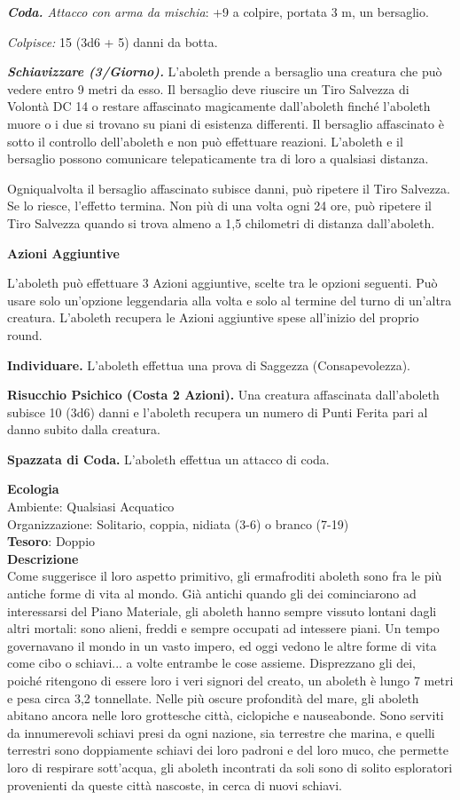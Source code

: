 \begin{multicols}{2}
\textit{\textbf{Coda.} Attacco con arma da mischia}: +9 a colpire, portata 3 m, un bersaglio.

\textit{Colpisce:} 15 (3d6 + 5) danni da botta.

\textit{\textbf{Schiavizzare (3/Giorno).}} L'aboleth prende a bersaglio una creatura che può vedere entro 9 metri da esso. Il bersaglio deve riuscire un Tiro Salvezza di Volontà DC 14 o restare affascinato magicamente dall'aboleth finché l'aboleth muore o i due si trovano su piani di esistenza differenti. Il bersaglio affascinato è sotto il controllo dell'aboleth e non può effettuare reazioni. L'aboleth e il bersaglio possono comunicare telepaticamente tra di loro a qualsiasi distanza.

Ogniqualvolta il bersaglio affascinato subisce danni, può ripetere il Tiro Salvezza. Se lo riesce, l'effetto termina. Non più di una volta ogni 24 ore, può ripetere il Tiro Salvezza quando si trova almeno a 1,5 chilometri di distanza dall'aboleth.

\textbf{Azioni Aggiuntive}

L'aboleth può effettuare 3 Azioni aggiuntive, scelte tra le opzioni seguenti. Può usare solo un'opzione leggendaria alla volta e solo al termine del turno di un'altra creatura. L'aboleth recupera le Azioni aggiuntive spese all'inizio del proprio round.

\textbf{Individuare.} L'aboleth effettua una prova di Saggezza (Consapevolezza).

\textbf{Risucchio Psichico (Costa 2 Azioni).} Una creatura affascinata dall'aboleth subisce 10 (3d6) danni e l'aboleth recupera un numero di Punti Ferita pari al danno subito dalla creatura.

\textbf{Spazzata di Coda.} L'aboleth effettua un attacco di coda.

\textbf{Ecologia}\\
Ambiente: Qualsiasi Acquatico\\
Organizzazione: Solitario, coppia, nidiata (3-6) o branco (7-19)\\
\textbf{Tesoro}: Doppio\\
\textbf{Descrizione}\\
Come suggerisce il loro aspetto primitivo, gli ermafroditi aboleth sono fra le più antiche forme di vita al mondo. Già antichi quando gli dei cominciarono ad interessarsi del Piano Materiale, gli aboleth hanno sempre vissuto lontani dagli altri mortali: sono alieni, freddi e sempre occupati ad intessere piani. Un tempo governavano il mondo in un vasto impero, ed oggi vedono le altre forme di vita come cibo o schiavi... a volte entrambe le cose assieme. Disprezzano gli dei, poiché ritengono di essere loro i veri signori del creato, un aboleth è lungo 7 metri e pesa circa 3,2 tonnellate. Nelle più oscure profondità del mare, gli aboleth abitano ancora nelle loro grottesche città, ciclopiche e nauseabonde. Sono serviti da innumerevoli schiavi presi da ogni nazione, sia terrestre che marina, e quelli terrestri sono doppiamente schiavi dei loro padroni e del loro muco, che permette loro di respirare sott'acqua, gli aboleth incontrati da soli sono di solito esploratori provenienti da queste città nascoste, in cerca di nuovi schiavi.


\end{multicols}
